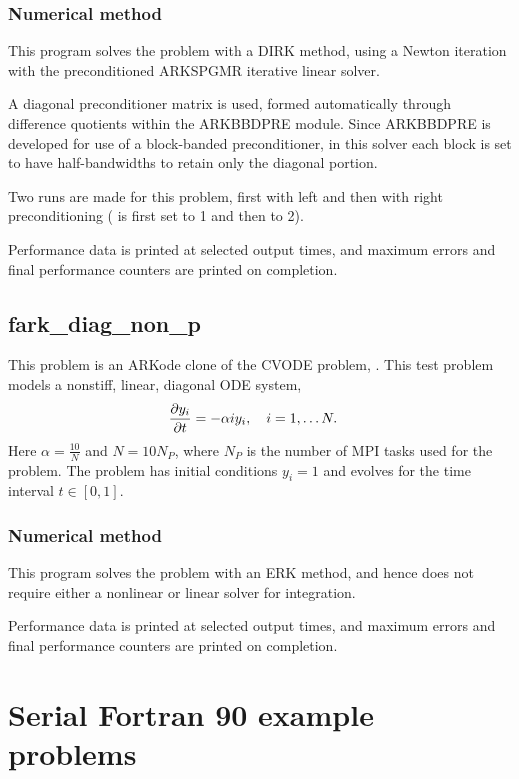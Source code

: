 \documentclass[letterpaper,10pt,english]{sphinxmanual}
\begin{document}
\subsection{Numerical method}
\label{f77_parallel:numerical-method}
This program solves the problem with a DIRK method, using a Newton
iteration with the preconditioned ARKSPGMR iterative linear solver.

A diagonal preconditioner matrix is used, formed automatically through
difference quotients within the ARKBBDPRE module.  Since ARKBBDPRE is
developed for use of a block-banded preconditioner, in this solver
each block is set to have half-bandwidths  to
retain only the diagonal portion.

Two runs are made for this problem, first with left and then with
right preconditioning ( is first set to 1 and then to 2).

Performance data is printed at selected output times, and maximum
errors and final performance counters are printed on completion.


\section{fark\_diag\_non\_p}
\label{f77_parallel:id2}\label{f77_parallel:fark-diag-non-p}
This problem is an ARKode clone of the CVODE problem,
.  This test problem models a nonstiff, linear,
diagonal ODE system,
\begin{gather}
\begin{split}\frac{\partial y_i}{\partial t} &= -\alpha i y_i, \quad i=1,\ldots N.\end{split}\notag
\end{gather}
Here $\alpha=\frac{10}{N}$ and $N=10 N_P$, where $N_P$ is the
number of MPI tasks used for the problem.  The problem has initial
conditions $y_i=1$ and evolves for the time interval $t\in [0,1]$.


\subsection{Numerical method}
\label{f77_parallel:id3}
This program solves the problem with an ERK method, and hence does not
require either a nonlinear or linear solver for integration.

Performance data is printed at selected output times, and maximum
errors and final performance counters are printed on completion.


\chapter{Serial Fortran 90 example problems}
\label{f90_serial:serial-f90}\label{f90_serial:serial-fortran-90-example-problems}\label{f90_serial::doc}
\end{document}
